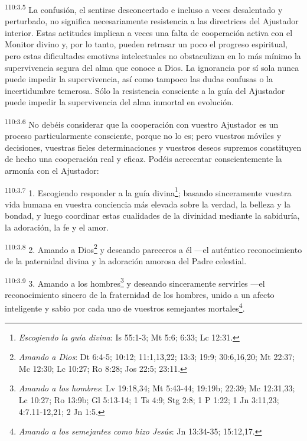 \documentclass[twoside, 11pt]{book}
\begin{document}
\par
\textsuperscript{110:3.5} La confusión, el sentirse desconcertado e incluso a veces desalentado y perturbado, no significa necesariamente resistencia a las directrices del Ajustador interior. Estas actitudes implican a veces una falta de cooperación activa con el Monitor divino y, por lo tanto, pueden retrasar un poco el progreso espiritual, pero estas dificultades emotivas intelectuales no obstaculizan en lo más mínimo la supervivencia segura del alma que conoce a Dios. La ignorancia por sí sola nunca puede impedir la supervivencia, así como tampoco las dudas confusas o la incertidumbre temerosa. Sólo la resistencia consciente a la guía del Ajustador puede impedir la supervivencia del alma inmortal en evolución.

\par
\textsuperscript{110:3.6} No debéis considerar que la cooperación con vuestro Ajustador es un proceso particularmente consciente, porque no lo es; pero vuestros móviles y decisiones, vuestras fieles determinaciones y vuestros deseos supremos constituyen de hecho una cooperación real y eficaz. Podéis acrecentar conscientemente la armonía con el Ajustador:

\par
\textsuperscript{110:3.7} 1. Escogiendo responder a la guía divina\footnote{\textit{Escogiendo la guía divina}: Is 55:1-3; Mt 5:6; 6:33; Lc 12:31.}; basando sinceramente vuestra vida humana en vuestra conciencia más elevada sobre la verdad, la belleza y la bondad, y luego coordinar estas cualidades de la divinidad mediante la sabiduría, la adoración, la fe y el amor.

\par
\textsuperscript{110:3.8} 2. Amando a Dios\footnote{\textit{Amando a Dios}: Dt 6:4-5; 10:12; 11:1,13,22; 13:3; 19:9; 30:6,16,20; Mt 22:37; Mc 12:30; Lc 10:27; Ro 8:28; Jos 22:5; 23:11.} y deseando pareceros a él ---el auténtico reconocimiento de la paternidad divina y la adoración amorosa del Padre celestial.

\par
\textsuperscript{110:3.9} 3. Amando a los hombres\footnote{\textit{Amando a los hombres}: Lv 19:18,34; Mt 5:43-44; 19:19b; 22:39; Mc 12:31,33; Lc 10:27; Ro 13:9b; Gl 5:13-14; 1 Ts 4:9; Stg 2:8; 1 P 1:22; 1 Jn 3:11,23; 4:7.11-12,21; 2 Jn 1:5.} y deseando sinceramente servirles ---el reconocimiento sincero de la fraternidad de los hombres, unido a un afecto inteligente y sabio por cada uno de vuestros semejantes mortales\footnote{\textit{Amando a los semejantes como hizo Jesús}: Jn 13:34-35; 15:12,17.}.
\end{document}
